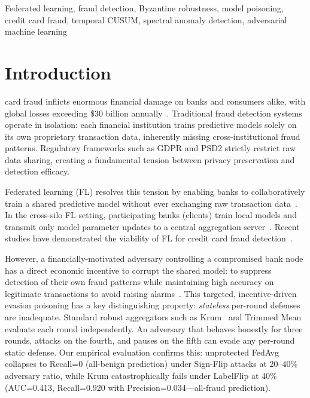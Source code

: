 \documentclass[journal]{IEEEtran}
\begin{document}
\begin{IEEEkeywords}
Federated learning, fraud detection, Byzantine robustness, model poisoning,
credit card fraud, temporal CUSUM, spectral anomaly detection,
adversarial machine learning
\end{IEEEkeywords}

\section{Introduction}
 card fraud inflicts enormous financial damage on
banks and consumers alike, with global losses exceeding \$30 billion
annually~\cite{farrukh2025blockchain}. Traditional fraud detection systems
operate in isolation: each financial institution trains predictive models
solely on its own proprietary transaction data, inherently missing
cross-institutional fraud patterns. Regulatory frameworks such as GDPR and
PSD2 strictly restrict raw data sharing, creating a fundamental tension
between privacy preservation and detection efficacy.

Federated learning (FL) resolves this tension by enabling banks to
collaboratively train a shared predictive model without ever exchanging
raw transaction data~\cite{mcmahan2017fedavg}. In the cross-silo FL
setting, participating banks (clients) train local models and transmit
only model parameter updates to a central aggregation
server~\cite{kairouz2021advances}. Recent studies have demonstrated
the viability of FL for credit card fraud detection~\cite{yang2019ffd,abdulsalam2024fl}.

However, a financially-motivated adversary controlling a compromised bank
node has a direct economic incentive to corrupt the shared model: to
suppress detection of their own fraud patterns while maintaining high
accuracy on legitimate transactions to avoid raising
alarms~\cite{bhagoji2019analyzing,bagdasaryan2018backdoor}. This
targeted, incentive-driven evasion poisoning has a key distinguishing
property: \emph{stateless} per-round defenses are inadequate. Standard
robust aggregators such as Krum~\cite{blanchard2017krum} and Trimmed
Mean~\cite{yin2018byzantine} evaluate each round independently. An
adversary that behaves honestly for three rounds, attacks on the fourth,
and pauses on the fifth can evade any per-round static defense. Our
empirical evaluation confirms this: unprotected FedAvg collapses to
Recall=0 (all-benign prediction) under Sign-Flip attacks at 20--40\%
adversary ratio, while Krum catastrophically fails under LabelFlip at 40\%
(AUC=0.413, Recall=0.920 with Precision=0.034—all-fraud prediction).
\end{document}
